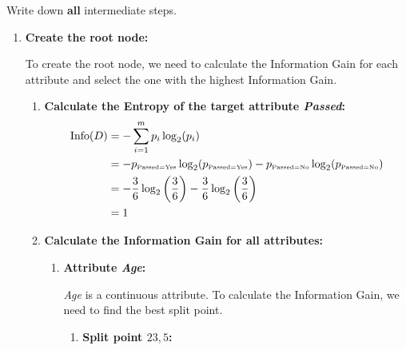 \documentclass[
english,
smallborders
]{i6prcsht}
\newcommand{\OfSpecificValue}[3]{_{\text{\tiny #1#2#3}}}
\begin{document}
Write down \textbf{all} intermediate steps.

\begin{solution}
\begin{enumerate}
\item \textbf{Create the root node:}

To create the root node, we need to calculate the Information Gain for each attribute and select the one with the highest Information Gain.

\begin{enumerate}
	\item \textbf{Calculate the Entropy of the target attribute \textit{Passed}:}
	      \begin{alignat*}{2}
		      \text{Info}(D) & = -\sum_{i=1}^{m}p_i \log_2(p_i)                                                                                                                          \\
		                     & = -p\OfSpecificValue{Passed}{=}{Yes} \log_2(p\OfSpecificValue{Passed}{=}{Yes})- p\OfSpecificValue{Passed}{=}{No} \log_2(p\OfSpecificValue{Passed}{=}{No}) \\
		                     & = -\frac{3}{6} \log_2\left(\frac{3}{6}\right) - \frac{3}{6} \log_2\left(\frac{3}{6}\right)                                                                \\
		                     & = 1                                                                                                                                                       \\
	      \end{alignat*}

	\item \textbf{Calculate the Information Gain for all attributes:}

	      \begin{enumerate}
		      \item \textbf{Attribute \textit{Age}:}

		            \textit{Age} is a continuous attribute. To calculate the Information Gain, we need to find the best split point.

		            \begin{enumerate}
			            \item \textbf{Split point $23,5$:}


\end{enumerate}
\end{enumerate}
\end{enumerate}
\end{enumerate}
\end{solution}
\end{document}
